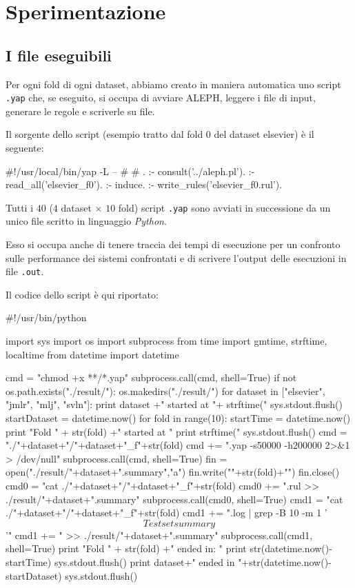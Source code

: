 \section{Sperimentazione}
\nocite{wiki:kfold}
\subsection{I file eseguibili}
Per ogni fold di ogni dataset, abbiamo creato in maniera automatica uno script \verb+.yap+ che, se eseguito, si occupa di avviare ALEPH, leggere i file di input, generare le regole e scriverle su file.

Il sorgente dello script (esempio tratto dal fold 0 del dataset elsevier) è il seguente:

\begin{prologcode}
#!/usr/local/bin/yap -L --
#
# .
:- consult('../aleph.pl').
:- read_all('elsevier_f0').
:- induce.
:- write_rules('elsevier_f0.rul').
\end{prologcode}

Tutti i $40$ ($4$ dataset $\times$ $10$ fold) script \verb+.yap+ sono avviati in successione da un unico file scritto in linguaggio \emph{Python}.

Esso si occupa anche di tenere traccia dei tempi di esecuzione per un confronto sulle performance dei sistemi confrontati e di scrivere l'output delle esecuzioni in file \verb+.out+.

Il codice dello script è qui riportato:

\begin{pythoncode}
#!/usr/bin/python

import sys
import os
import subprocess
from time import gmtime, strftime, localtime
from datetime import datetime

cmd = "chmod +x **/*.yap"
subprocess.call(cmd, shell=True)
if not os.path.exists("./result/"):
    os.makedirs("./result/")
for dataset in ["elsevier", "jmlr", "mlj", "svln"]:
    print dataset +" started at "+ strftime("%
    sys.stdout.flush()
    startDataset = datetime.now()
    for fold in range(10):
        startTime = datetime.now()
        print "Fold " + str(fold) +" started at "
        print strftime("%
        sys.stdout.flush()
        cmd = "./"+dataset+"/"+dataset+"_f"+str(fold)
        cmd += ".yap -s50000 -h200000 2>&1 > /dev/null"
        subprocess.call(cmd, shell=True)
        fin = open("./result/"+dataset+".summary","a")
        fin.write("\nFold "+str(fold)+"\n")
        fin.close()
        cmd0 = "cat ./"+dataset+"/"+dataset+"_f"+str(fold)
        cmd0 += ".rul >> ./result/"+dataset+".summary"
        subprocess.call(cmd0, shell=True)
        cmd1 = "cat ./"+dataset+"/"+dataset+"_f"+str(fold)
        cmd1 += ".log | grep -B 10 -m 1 '\[Test set summary\]'"
        cmd1 += " >> ./result/"+dataset+".summary"
        subprocess.call(cmd1, shell=True)
        print "Fold " + str(fold) +" ended in: "
        print str(datetime.now()-startTime)
        sys.stdout.flush()
    print dataset+" ended in "+str(datetime.now()-startDataset)
    sys.stdout.flush()
\end{pythoncode}


